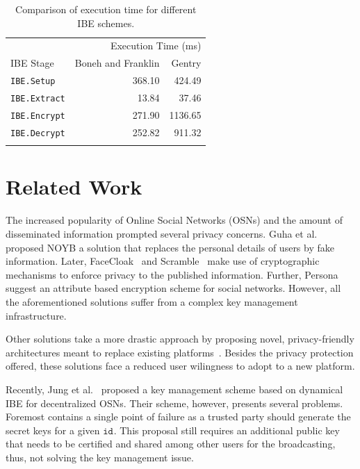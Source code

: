 \documentclass[journal]{IEEEtran}
\newcommand{\id}[1]{\ensuremath{\mathtt{id}_{#1}}}
\begin{document}
\begin{table}
  \centering
  \begin{tabular}{@{}lrr@{}} \toprule
    \multicolumn{3}{r}{Execution Time (ms)} \\ \cmidrule(r){2-3}
    IBE Stage & Boneh and Franklin & Gentry \\ \midrule
    \texttt{IBE.Setup} & 368.10  &  424.49  \\
  \texttt{IBE.Extract} & 13.84  & 37.46  \\
  \texttt{IBE.Encrypt} & 271.90  & 1136.65  \\
  \texttt{IBE.Decrypt} & 252.82  & 911.32 \\ \bottomrule
    & & \\
  \end{tabular}
  \caption{Comparison of execution time for different IBE schemes.}
  \label{table:BE_exec_times}
\end{table}

\section{Related Work}\label{sec:relwork}
The increased popularity of Online Social Networks (OSNs) and the amount of disseminated information prompted several privacy concerns. 
Guha et al.~\cite{Guha:2008} proposed NOYB a solution that replaces the personal details of users by fake information. Later, FaceCloak~\cite{Luo:2009} and Scramble~\cite{BeatoScramble} make use of cryptographic mechanisms to enforce privacy to the published information. Further, Persona suggest an attribute based encryption scheme for social networks. However, all the aforementioned solutions suffer from a complex key management infrastructure. 


Other solutions take a more drastic approach by proposing novel, privacy-friendly architectures meant to replace existing platforms~\cite{DBLP:conf/sp/CristofaroSTW12,NYT2010.Diaspora,DBLP:conf/wowmom/CutilloMO11}. Besides the privacy protection offered, these solutions face a reduced user wilingness to adopt to a new platform.

Recently, Jung et al.~\cite{jung} proposed a key management scheme based on dynamical IBE for decentralized OSNs. Their scheme, however, presents several problems. Foremost contains a single point of failure as a trusted party should generate the secret keys for a given \id{}. This proposal still requires an additional public key that needs to be certified and shared among other users for the broadcasting, thus, not solving the key management issue.
\end{document}
